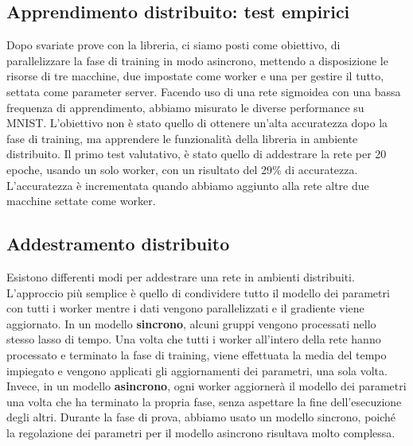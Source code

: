 \documentclass[DIV=calc, paper=a4, fontsize=11pt]{scrartcl}	 %
\begin{document}
\begin{multicols}{2}
		\section{Apprendimento distribuito: test empirici}	
		Dopo svariate prove con la libreria, ci siamo posti come obiettivo, di parallelizzare la fase di training in modo asincrono, mettendo a disposizione le risorse di tre macchine, due impostate come worker e una per gestire il tutto, settata come parameter server. Facendo uso di una rete sigmoidea con una bassa frequenza di apprendimento, abbiamo misurato le diverse performance su MNIST. L'obiettivo non è stato quello di ottenere un'alta accuratezza dopo la fase di training, ma apprendere le funzionalità della libreria in ambiente distribuito.
		Il primo test valutativo, è stato quello di addestrare la rete per 20 epoche, usando un solo worker, con un risultato del 29\% di accuratezza. L'accuratezza è incrementata quando abbiamo aggiunto alla rete altre due macchine settate come worker.
			\subsection{Addestramento distribuito}
				Esistono differenti modi per addestrare una rete in ambienti distribuiti. L'approccio più semplice è quello di condividere tutto il modello dei parametri con tutti i worker mentre i dati vengono parallelizzati e il gradiente viene aggiornato. In un modello \textbf{sincrono}, alcuni gruppi vengono processati nello stesso lasso di tempo. Una volta che tutti i worker all'intero della rete hanno processato e terminato la fase di training, viene effettuata la media del tempo impiegato e vengono applicati gli aggiornamenti dei parametri, una sola volta. Invece, in un modello \textbf{asincrono}, ogni worker aggiornerà il modello dei parametri una volta che ha terminato la propria fase, senza aspettare la fine dell'esecuzione degli altri. Durante la fase di prova, abbiamo usato un modello sincrono, poiché la regolazione dei parametri per il modello asincrono risultava molto complessa.

\end{multicols}
\end{document}

